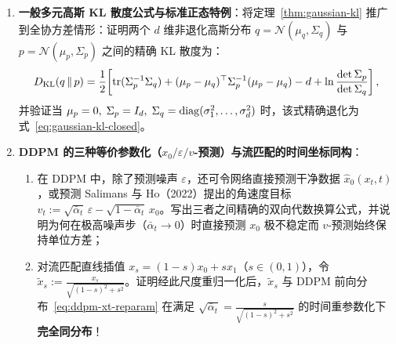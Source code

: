 \begin{enumerate}
  \item[\textbf{5.6.3}] \textbf{一般多元高斯 KL 散度公式与标准正态特例}：将定理~\ref{thm:gaussian-kl} 推广到全协方差情形：证明两个 $d$ 维非退化高斯分布 $q = \mathcal{N}(\mu_q, \Sigma_q)$ 与 $p = \mathcal{N}(\mu_p, \Sigma_p)$ 之间的精确 KL 散度为：
  \[
    D_{\mathrm{KL}}(q \,\|\, p) = \frac{1}{2}\!\left[\operatorname{tr}(\Sigma_p^{-1}\Sigma_q) + (\mu_p - \mu_q)^\top \Sigma_p^{-1}(\mu_p - \mu_q) - d + \ln \frac{\det \Sigma_p}{\det \Sigma_q}\right],
  \]
  并验证当 $\mu_p = 0,\; \Sigma_p = I_d,\; \Sigma_q = \operatorname{diag}(\sigma_1^2, \dots, \sigma_d^2)$ 时，该式精确退化为式~\eqref{eq:gaussian-kl-closed}。

  \item[\textbf{5.6.4}] \textbf{DDPM 的三种等价参数化（$x_0 / \varepsilon / v$-预测）与流匹配的时间坐标同构}：
  \begin{enumerate}
    \item 在 DDPM 中，除了预测噪声 $\varepsilon$，还可令网络直接预测干净数据 $\hat{x}_0(x_t, t)$，或预测 Salimans 与 Ho（2022）提出的角速度目标 $v_t := \sqrt{\bar{\alpha}_t}\,\varepsilon - \sqrt{1 - \bar{\alpha}_t}\,x_0$。写出三者之间精确的双向代数换算公式，并说明为何在极高噪声步（$\bar{\alpha}_t \to 0$）时直接预测 $x_0$ 极不稳定而 $v$-预测始终保持单位方差；
    \item 对流匹配直线插值 $x_s = (1 - s)x_0 + s x_1$（$s \in (0, 1)$），令 $\tilde{x}_s := \frac{x_s}{\sqrt{(1-s)^2 + s^2}}$。证明经此尺度重归一化后，$\tilde{x}_s$ 与 DDPM 前向分布~\eqref{eq:ddpm-xt-reparam} 在满足 $\sqrt{\bar{\alpha}_t} = \frac{s}{\sqrt{(1-s)^2 + s^2}}$ 的时间重参数化下\textbf{完全同分布}！
  \end{enumerate}
\end{enumerate}


